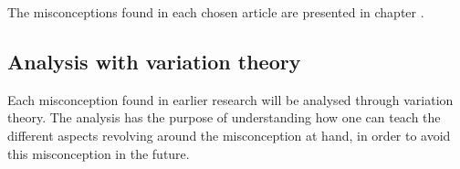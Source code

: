 The misconceptions found in each chosen article are presented in chapter 
. 


\subsection{Analysis with variation theory}

Each misconception found in earlier research will be analysed through 
variation theory. The analysis has the purpose of understanding how one can 
teach the different aspects revolving around the misconception at hand, in 
order to avoid this misconception in the future. 